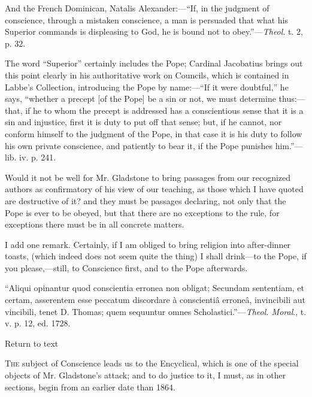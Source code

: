 And the French Dominican, Natalis Alexander:—``If, in the
judgment of conscience, through a mistaken conscience, a man is
persuaded that what his Superior commands is displeasing to God,
he is bound not to obey.''—\emph{Theol}. t. 2, p. 32.

The word ``Superior'' certainly includes the Pope; Cardinal
Jacobatius brings out this point clearly in his authoritative work on
Councils, which is contained in Labbe's Collection, introducing the Pope
by name:—``If it were doubtful,'' he says, ``whether a
precept [of the Pope] be a sin or not, we must determine thus:—that,
if he to whom the precept is addressed has a conscientious sense that it
is a sin and injustice, first it is duty to put off that sense; but, if
he cannot, nor conform himself to the judgment of the Pope, in that case
it is his duty to follow his own private conscience, and patiently to
bear it, if the Pope punishes him.''—lib. iv. p. 241.

Would it not be well for Mr. Gladstone to bring passages from our
recognized authors as confirmatory of his view of our teaching, as those
which I have quoted are destructive of it? and they must be passages
declaring, not only that the Pope is ever to be obeyed, but that there
are no exceptions to the rule, for exceptions there must be in all
concrete matters.

I add one remark. Certainly, if I am obliged to bring religion into
after-dinner toasts, (which indeed does not seem quite the thing) I
shall drink—to the Pope, if you please,—still, to Conscience first,
and to the Pope afterwards.


``Aliqui opinantur quod conscientia erronea non obligat; Secundam
sententiam, et certam, asserentem esse peccatum discordare à
conscientiâ erroneâ, invincibili aut vincibili, tenet D. Thomas; quem
sequuntur omnes Scholastici.''—\emph{Theol. Moral}., t. v. p. 12,
ed. 1728.

Return to text


T\textsc{he} subject of Conscience leads us to the Encyclical, which is
one of the special objects of Mr. Gladstone's attack; and to do justice
to it, I must, as in other sections, begin from an earlier date than
1864.

